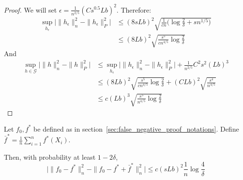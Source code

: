 \begin{proof}
We will set $\epsilon = \frac{1}{n^{2/5}} (C s^{0.5} L b)^2$. 
Therefore:
\begin{align*}
\sup_{h_\epsilon} \Big|  \|h_\epsilon\|^2_n - \|h_\epsilon\|^2_P \Big| &\leq
   (8sLb)^2 \sqrt{ \frac{1}{cn} \big(\log \frac{2}{\delta} 
        + s n^{1/5}  \big) } \\
  &\leq (8Lb)^2 \sqrt{ \frac{s^5}{cn^{4/5}} \log \frac{2}{\delta} }
\end{align*}
And
\begin{align*}
\sup_{h \in \mathcal{G}}  \Big| \|h\|^2_n - \|h\|^2_P \Big| &\leq 
\sup_{h_\epsilon} \Big| \|h_\epsilon\|^2_n - \|h_\epsilon\|^2_P \Big| 
        + \frac{1}{n^{2/5}} C^2 s^2 (Lb)^3 \\
  &\leq (8Lb)^2 \sqrt{ \frac{s^5}{c n^{4/5}} \log \frac{2}{\delta}}
     + (CLb)^2 \sqrt{ \frac{s^4}{n^{4/5}} } \\
  &\leq c (Lb)^3 \sqrt{ \frac{s^5}{n^{4/5}} \log \frac{2}{\delta}}
\end{align*}

\end{proof}



\begin{lemma}
\label{lem:remove_centering}

Let $f_0, f^*$ be defined as in section~\ref{sec:false_negative_proof_notations}. Define $\bar{f}^* = \frac{1}{n} \sum_{i=1}^n f^*(X_i)$.

Then, with probability at least $1 - 2\delta$,
\[
\Big | \| f_0 - f^* \|_n^2 - \| f_0 - f^* + \bar{f}^* \|_n^2 \Big| \leq
    c (sLb)^2 \frac{1}{n} \log \frac{4}{\delta}
\]
\end{lemma}

